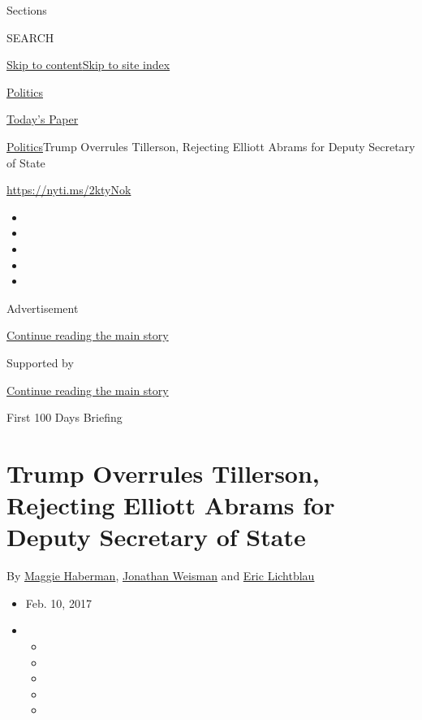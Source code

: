 Sections

SEARCH

\protect\hyperlink{site-content}{Skip to
content}\protect\hyperlink{site-index}{Skip to site index}

\href{https://www.nytimes.com/section/politics}{Politics}

\href{https://myaccount.nytimes.com/auth/login?response_type=cookie\&client_id=vi}{}

\href{https://www.nytimes.com/section/todayspaper}{Today's Paper}

\href{/section/politics}{Politics}\textbar{}Trump Overrules Tillerson,
Rejecting Elliott Abrams for Deputy Secretary of State

\url{https://nyti.ms/2ktyNok}

\begin{itemize}
\item
\item
\item
\item
\item
\end{itemize}

Advertisement

\protect\hyperlink{after-top}{Continue reading the main story}

Supported by

\protect\hyperlink{after-sponsor}{Continue reading the main story}

First 100 Days Briefing

\hypertarget{trump-overrules-tillerson-rejecting-elliott-abrams-for-deputy-secretary-of-state}{%
\section{Trump Overrules Tillerson, Rejecting Elliott Abrams for Deputy
Secretary of
State}\label{trump-overrules-tillerson-rejecting-elliott-abrams-for-deputy-secretary-of-state}}

By \href{http://www.nytimes.com/by/maggie-haberman}{Maggie Haberman},
\href{http://www.nytimes.com/by/jonathan-weisman}{Jonathan Weisman} and
\href{http://www.nytimes.com/by/eric-lichtblau}{Eric Lichtblau}

\begin{itemize}
\item
  Feb. 10, 2017
\item
  \begin{itemize}
  \item
  \item
  \item
  \item
  \item
  \end{itemize}
\end{itemize}

